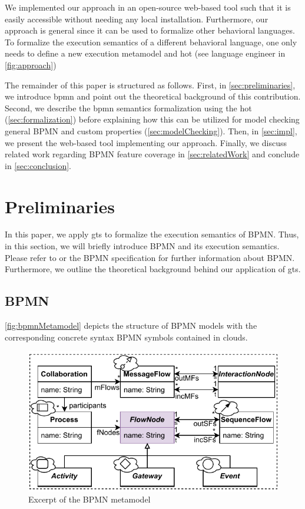 \documentclass[runningheads]{llncs}
\begin{document}
We implemented our approach in an open-source web-based tool such that it is easily accessible without needing any local installation.
Furthermore, our approach is general since it can be used to formalize other behavioral languages.
To formalize the execution semantics of a different behavioral language, one only needs to define a new execution metamodel and \gls*{hot} (see language engineer in \autoref{fig:approach})

The remainder of this paper is structured as follows.
First, in \autoref{sec:preliminaries}, we introduce \gls*{bpmn} and point out the theoretical background of this contribution.
Second, we describe the \gls*{bpmn} semantics formalization using the \gls*{hot} (\autoref{sec:formalization}) before explaining how this can be utilized for model checking general BPMN and custom properties (\autoref{sec:modelChecking}).
Then, in \autoref{sec:impl}, we present the web-based tool implementing our approach.
Finally, we discuss related work regarding BPMN feature coverage in \autoref{sec:relatedWork} and conclude in \autoref{sec:conclusion}.

\section{Preliminaries} \label{sec:preliminaries}
In this paper, we apply \gls*{gt}s to formalize the execution semantics of BPMN.
Thus, in this section, we will briefly introduce BPMN and its execution semantics.
Please refer to \cite{freundRealLifeBPMNUsing2019} or the BPMN specification \cite{objectmanagementgroupBusinessProcessModel2013} for further information about BPMN.
Furthermore, we outline the theoretical background behind our application of \gls*{gt}s.
\subsection{BPMN}
\autoref{fig:bpmnMetamodel} depicts the structure of BPMN models with the corresponding concrete syntax BPMN symbols contained in clouds.

\begin{figure}[ht]
  \centering
  \includegraphics[width=0.75\linewidth]{images/bpmn_semantics-bpmn-metamodel.pdf}
  \caption{Excerpt of the BPMN metamodel \cite{objectmanagementgroupBusinessProcessModel2013}}
  \label{fig:bpmnMetamodel}
\end{figure}
\end{document}
